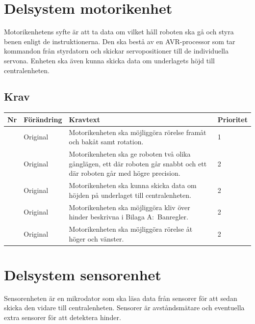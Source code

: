 \documentclass[a4paper,titlepage,12pt]{article}
\newcounter{reqNr}
\newcommand{\nextReqNr}{\stepcounter{reqNr}\arabic{reqNr}}
\begin{document}

	\section{Delsystem motorikenhet}
	Motorikenhetens syfte är att ta data om vilket håll roboten ska gå och styra benen enligt de
	instruktionerna. Den ska bestå av en AVR-processor som tar kommandon från styrdatorn och skickar
	servopositioner till de individuella servona. Enheten ska även kunna skicka data om underlagets
	höjd till centralenheten.

	\subsection{Krav}
	\begin{longtable}[c]{ c l>{\raggedright}p{} l }
		\textbf{Nr} & \textbf{Förändring} & \textbf{Kravtext} & \textbf{Prioritet} 
			\\ \midrule

		\nextReqNr{} & Original & Motorikenheten ska möjliggöra rörelse framåt och 
			bakåt samt rotation. & 1
			\\ \midrule

		\nextReqNr{} & Original & Motorikenheten ska ge roboten två olika gånglägen,
			ett där roboten går 
			snabbt och ett där roboten går med högre precision.& 2
			\\ \midrule

		\nextReqNr{} & Original & Motorikenheten ska kunna skicka data om höjden 
			på underlaget till centralenheten. & 2
			\\ \midrule

		\nextReqNr{} & Original & Motorikenheten ska möjliggöra kliv över hinder 
			beskrivna i Bilaga A:\
			Banregler. & 2
			\\ \midrule

		\nextReqNr{} & Original & Motorikenheten ska möjliggöra rörelse åt höger 
			och vänster. & 2 

	\end{longtable}


	\section{Delsystem sensorenhet}
	Sensorenheten är en mikrodator som ska läsa data från sensorer för att sedan skicka 
	den vidare till centralenheten. Sensorer är avståndsmätare och eventuella extra sensorer 
	för att detektera hinder.
\end{document}
